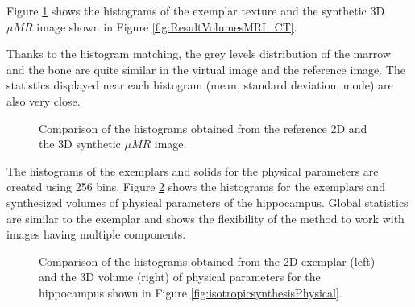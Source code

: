 Figure \ref{fig:histogramsMuMR} shows the histograms of the exemplar texture and the synthetic 3D $\mu{MR}$ 
image shown in Figure \ref{fig:ResultVolumesMRI_CT}. 

Thanks to the histogram matching, 
the grey levels distribution of the marrow and the bone are quite similar in the virtual image and the reference image. 
The statistics displayed near each histogram (mean, standard deviation, mode) are also very close.

\begin{figure}[h!]
 \centering 
\caption[Histogram comparison: $\mu{MR}$]{Comparison of the histograms obtained from the reference 2D and the 3D synthetic $\mu{MR}$ image.}
 \label{fig:histogramsMuMR}
\end{figure}


The histograms of the exemplars and solids for the physical parameters are created 
using 256 bins. Figure \ref{fig:histogramsPhysical} shows the histograms for the 
exemplars and synthesized volumes of physical parameters of the hippocampus. 
Global statistics are similar to the exemplar and shows the flexibility of the method
to work with images having multiple components. 

\begin{figure}[h!]
 \centering 
\caption[Histogram comparison: physical parameters.]{Comparison of the histograms obtained from the 2D exemplar (left)
                                                     and the 3D volume (right) of physical parameters for the hippocampus
                                                    shown in Figure \ref{fig:isotropicsynthesisPhysical}.}
 \label{fig:histogramsPhysical}
\end{figure}



